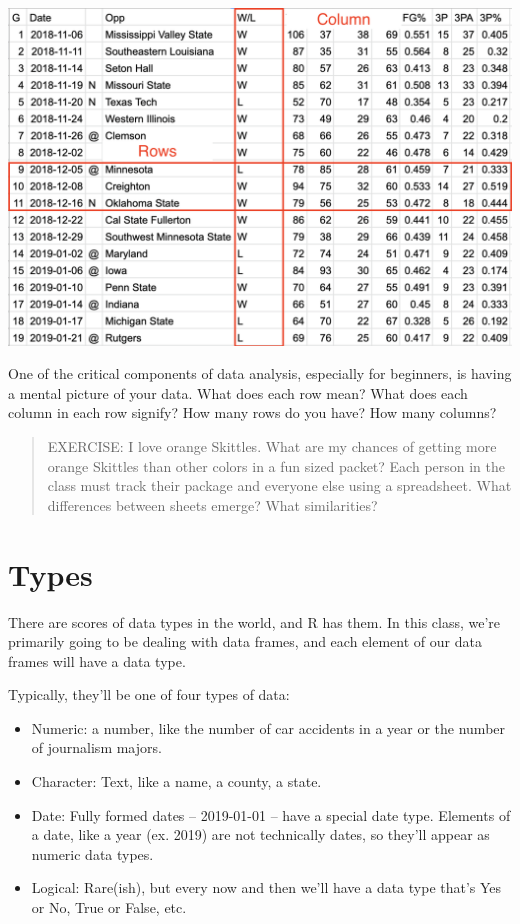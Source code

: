 \documentclass[]{book}
\providecommand{\tightlist}{%
  \setlength{\itemsep}{0pt}\setlength{\parskip}{0pt}}
\begin{document}
\includegraphics[width=22in]{images/data1}

One of the critical components of data analysis, especially for beginners, is having a mental picture of your data. What does each row mean? What does each column in each row signify? How many rows do you have? How many columns?

\begin{quote}
EXERCISE: I love orange Skittles. What are my chances of getting more orange Skittles than other colors in a fun sized packet? Each person in the class must track their package and everyone else using a spreadsheet. What differences between sheets emerge? What similarities?
\end{quote}

\hypertarget{types}{%
\section{Types}\label{types}}

There are scores of data types in the world, and R has them. In this class, we're primarily going to be dealing with data frames, and each element of our data frames will have a data type.

Typically, they'll be one of four types of data:

\begin{itemize}
\tightlist
\item
  Numeric: a number, like the number of car accidents in a year or the number of journalism majors.
\item
  Character: Text, like a name, a county, a state.
\item
  Date: Fully formed dates -- 2019-01-01 -- have a special date type. Elements of a date, like a year (ex. 2019) are not technically dates, so they'll appear as numeric data types.
\item
  Logical: Rare(ish), but every now and then we'll have a data type that's Yes or No, True or False, etc.
\end{itemize}
\end{document}
